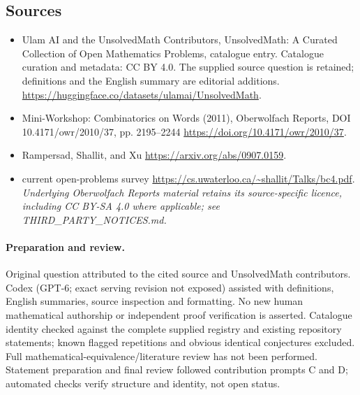 \documentclass[11pt]{article}
\begin{document}
\subsection{Sources}
\begin{itemize}
\item[\hypertarget{source:statement:1}{S1}] Ulam AI and the UnsolvedMath Contributors, UnsolvedMath: A Curated Collection of Open Mathematics Problems, catalogue entry. Catalogue curation and metadata: CC BY 4.0. The supplied source question is retained; definitions and the English summary are editorial additions.
\url{https://huggingface.co/datasets/ulamai/UnsolvedMath}.
\item[\hypertarget{source:statement:2}{S2}] Mini-Workshop: Combinatorics on Words (2011), Oberwolfach Reports, DOI 10.4171/owr/2010/37, pp. 2195--2244
\url{https://doi.org/10.4171/owr/2010/37}.
\item[\hypertarget{source:statement:3}{S3}] Rampersad, Shallit, and Xu
\url{https://arxiv.org/abs/0907.0159}.
\item[\hypertarget{source:statement:4}{S4}] current open-problems survey
\url{https://cs.uwaterloo.ca/~shallit/Talks/bc4.pdf}.
\textit{Underlying Oberwolfach Reports material retains its source-specific licence, including CC BY-SA 4.0 where applicable; see THIRD\_PARTY\_NOTICES.md.}
\end{itemize}
\paragraph{Preparation and review.}
Original question attributed to the cited source and UnsolvedMath contributors. Codex (GPT-6; exact serving revision not exposed) assisted with definitions, English summaries, source inspection and formatting. No new human mathematical authorship or independent proof verification is asserted. Catalogue identity checked against the complete supplied registry and existing repository statements; known flagged repetitions and obvious identical conjectures excluded. Full mathematical-equivalence/literature review has not been performed. Statement preparation and final review followed contribution prompts C and D; automated checks verify structure and identity, not open status.
\label{end:statement}
\end{document}

